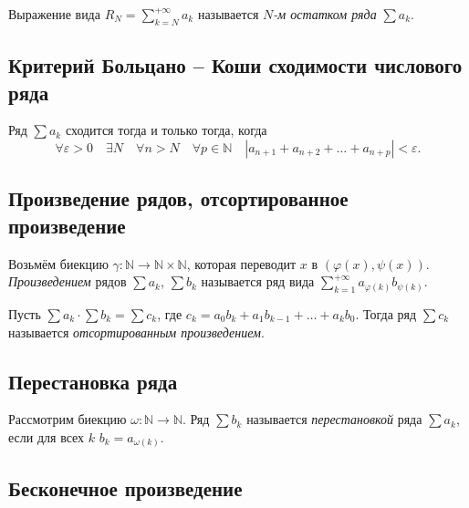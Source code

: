 \begin{definition}
	Выражение вида \(R_N = \sum\limits_{k=N}^{+\infty} a_k\) называется \textit{\(N\)-м остатком ряда} \(\sum a_k\).
\end{definition}

\subsection{Критерий Больцано -- Коши сходимости числового ряда}

\begin{theorem}
	Ряд \(\sum a_k\) сходится тогда и только тогда, когда \[
	\forall \varepsilon > 0 \quad \exists N \quad \forall n > N \quad \forall p \in \mathbb{N} \quad |a_{n+1} + a_{n+2} + \ldots + a_{n+p}| < \varepsilon.
	\]
\end{theorem}

\subsection{Произведение рядов, отсортированное произведение}

\begin{ndefinition}
	Возьмём биекцию \(\gamma \colon \mathbb{N} \to \mathbb{N} \times \mathbb{N}\), которая переводит \(x\) в \((\varphi(x), \psi(x))\). \textit{Произведением} рядов \(\sum a_k\), \(\sum b_k\) называется ряд вида \(\sum_{k=1}^{+\infty} a_{\varphi(k)} b_{\psi(k)}\).
\end{ndefinition}

\begin{ndefinition}
	Пусть \(\sum a_k \cdot \sum b_k = \sum c_k\), где \(c_k = a_0 b_k + a_1 b_{k-1} + \ldots + a_k b_0\). Тогда ряд \(\sum c_k\) называется \textit{отсортированным произведением}.
\end{ndefinition}

\subsection{Перестановка ряда}

\begin{definition}
	Рассмотрим биекцию \(\omega \colon \mathbb{N} \to \mathbb{N}\). Ряд \(\sum b_k\) называется \textit{перестановкой} ряда \(\sum a_k\), если для всех \(k\) \(b_k = a_{\omega(k)}\). 
\end{definition}

\subsection{Бесконечное произведение}

